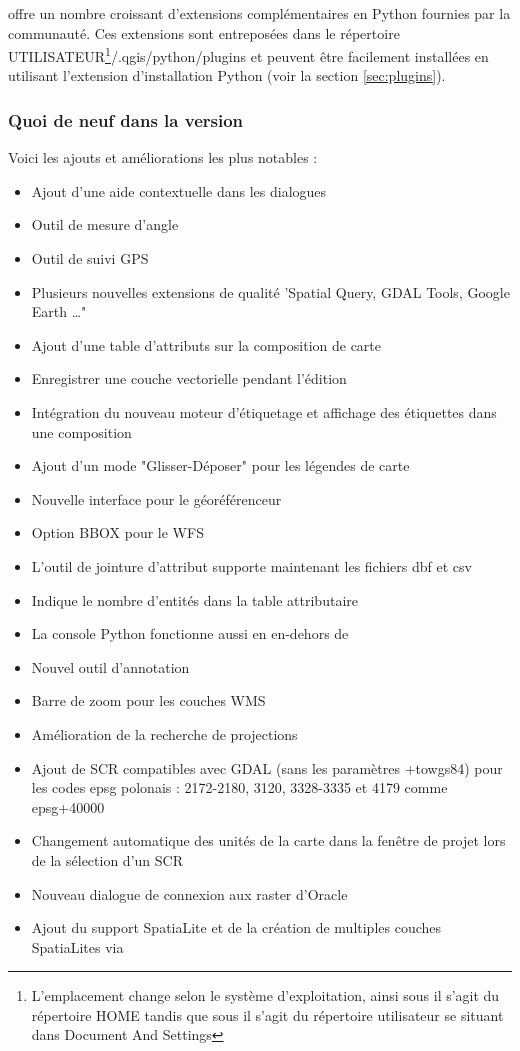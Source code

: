 
\qg offre un nombre croissant d'extensions complémentaires en Python fournies par la communauté. Ces extensions sont entreposées dans le répertoire UTILISATEUR\footnote{L'emplacement change selon le système d'exploitation, ainsi sous \nix{} il s'agit du répertoire HOME tandis que sous \win{} il s'agit du répertoire utilisateur se situant dans Document And Settings}/.qgis/python/plugins et peuvent être facilement installées en utilisant l'extension d'installation Python (voir la section \ref{sec:plugins}). 

\subsubsection{Quoi de neuf dans la version ~\CURRENT} 

Voici les ajouts et améliorations les plus notables :
\begin{itemize}[label=--]
 \item Ajout d'une aide contextuelle dans les dialogues
 \item Outil de mesure d'angle
 \item Outil de suivi GPS 
 \item Plusieurs nouvelles extensions de qualité 'Spatial Query, GDAL Tools, Google Earth \dots"
 \item Ajout d'une table d'attributs sur la composition de carte
 \item Enregistrer une couche vectorielle pendant l'édition
 \item Intégration du nouveau moteur d'étiquetage et affichage des étiquettes dans une composition
 \item Ajout d'un mode "Glisser-Déposer" pour les légendes de carte
 \item Nouvelle interface pour le géoréférenceur
 \item Option BBOX pour le WFS 
 \item L'outil de jointure d'attribut supporte maintenant les fichiers dbf et csv
 \item Indique le nombre d'entités dans la table attributaire
 \item La console Python fonctionne aussi en en-dehors de \qg
 \item Nouvel outil d'annotation
 \item Barre de zoom pour les couches WMS
 \item Amélioration de la recherche de projections
 \item Ajout de SCR compatibles avec GDAL (sans les paramètres +towgs84) pour les codes epsg polonais : 2172-2180, 3120, 3328-3335 et 4179 comme epsg+40000
 \item Changement automatique des unités de la carte dans la fenêtre de projet lors de la sélection d'un SCR
 \item Nouveau dialogue de connexion aux raster d'Oracle
 \item Ajout du support SpatiaLite et de la création de multiples couches SpatiaLites via \qg
\end{itemize}
